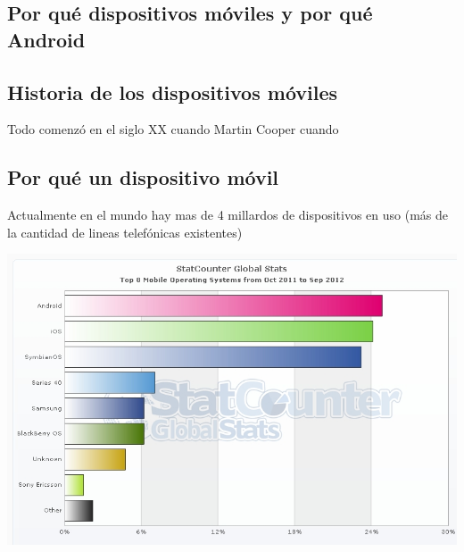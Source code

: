 \documentclass[letterpaper,12pt,dvips]{book}
\newcommand{\fnz}{\footnotesize}
\newcounter{ejemplo}
\begin{document}
\begin{mainmatter}

 \pagestyle{fancyplain}
 \lhead[\fancyplain{}{}]
       {\fancyplain{}{\fnz{\rightmark}}}
 \rhead[\fancyplain{}{\fnz{\leftmark}}]
       {\fancyplain{}{}}


\part{Por qué dispositivos móviles y por qué Android}
\chapter{Historia de los dispositivos móviles}\label{cap:historia}

Todo comenzó en el siglo XX cuando Martin Cooper cuando 





\setcounter{ejemplo}{0}
\chapter{Por qué un dispositivo móvil}\label{cap:moviles}

Actualmente en el mundo hay mas de 4 millardos de dispositivos en uso (más de la cantidad de lineas telefónicas existentes)

	
	\begin{center} 
		\includegraphics[scale=0.5]{androidpart1.jpg}\\
	\end{center}



\end{mainmatter}
\end{document}
